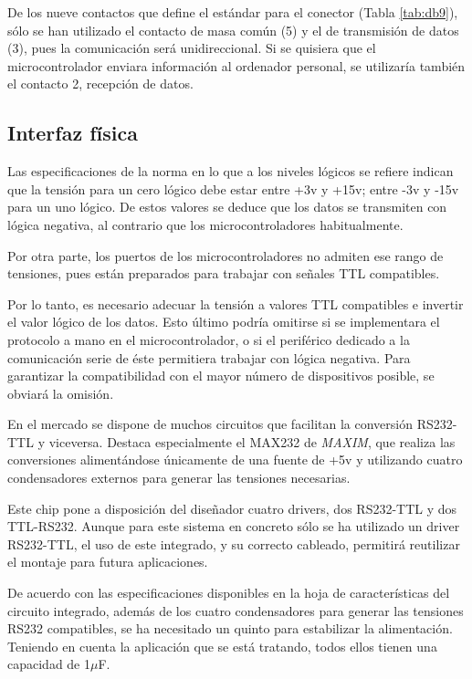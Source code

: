De los nueve contactos que define el estándar para el conector (Tabla \ref{tab:db9}), sólo se han utilizado el contacto de masa común (5) y el de transmisión de datos (3), pues la comunicación será unidireccional. Si se quisiera que el microcontrolador enviara información al ordenador personal, se utilizaría también el contacto 2, recepción de datos.

\subsection{Interfaz física}
\label{subsec:trans_fis}

Las especificaciones de la norma en lo que a los niveles lógicos se refiere indican que la tensión para un cero lógico debe estar entre +3v y +15v; entre -3v y -15v para un uno lógico. De estos valores se deduce que los datos se transmiten con lógica negativa, al contrario que los microcontroladores habitualmente.

Por otra parte, los puertos de los microcontroladores no admiten ese rango de tensiones, pues están preparados para trabajar con señales TTL compatibles.

Por lo tanto, es necesario adecuar la tensión a valores TTL compatibles e invertir el valor lógico de los datos. Esto último podría omitirse si se implementara el protocolo a mano en el microcontrolador, o si el periférico dedicado a la comunicación serie de éste permitiera trabajar con lógica negativa. Para garantizar la compatibilidad con el mayor número de dispositivos posible, se obviará la omisión.

En el mercado se dispone de muchos circuitos que facilitan la conversión RS232-TTL y viceversa. Destaca especialmente el MAX232\cite{max232} de \textit{MAXIM}, que realiza las conversiones alimentándose únicamente de una fuente de +5v y utilizando cuatro condensadores externos para generar las tensiones necesarias.

Este chip pone a disposición del diseñador cuatro drivers, dos RS232-TTL y dos TTL-RS232. Aunque para este sistema en concreto sólo se ha utilizado un driver RS232-TTL, el uso de este integrado, y su correcto cableado, permitirá reutilizar el montaje para futura aplicaciones.

De acuerdo con las especificaciones disponibles en la hoja de características del circuito integrado, además de los cuatro condensadores para generar las tensiones RS232 compatibles, se ha necesitado un quinto para estabilizar la alimentación. Teniendo en cuenta la aplicación que se está tratando, todos ellos tienen una capacidad de 1$\mu$F.

